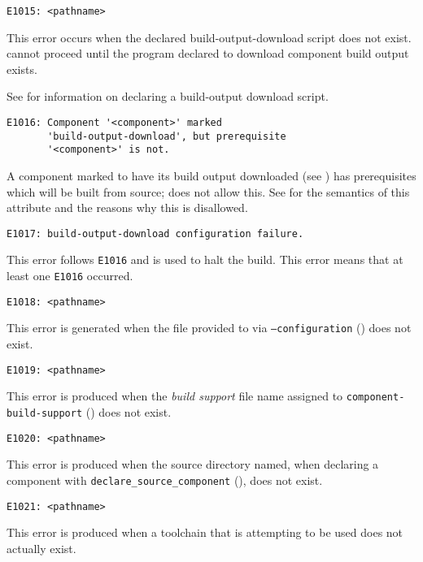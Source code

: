 \begin{verbatim}
E1015: <pathname>
\end{verbatim}

This error occurs when the declared build-output-download script does
not exist.  \lmsbw cannot proceed until the program declared to
download component build output exists.

See  for
information on declaring a build-output download script.


\begin{verbatim}
E1016: Component '<component>' marked
       'build-output-download', but prerequisite
       '<component>' is not.
\end{verbatim}

A component marked to have its build output downloaded (see
) has prerequisites which will be
built from source; \lmsbw does not allow this.  See
 for the semantics of this
attribute and the reasons why this is disallowed.


\begin{verbatim}
E1017: build-output-download configuration failure.
\end{verbatim}

This error follows \texttt{E1016} and is used to halt the build.  This
error means that at least one \texttt{E1016} occurred.


\begin{verbatim}
E1018: <pathname>
\end{verbatim}

This error is generated when the file provided to via
\texttt{--configuration} () does not
exist.


\begin{verbatim}
E1019: <pathname>
\end{verbatim}

This error is produced when the \emph{build support} file name
assigned to \texttt{component-build-support}
() does not exist.


\begin{verbatim}
E1020: <pathname>
\end{verbatim}

This error is produced when the source directory named, when declaring
a component with \texttt{declare\_source\_component}
(), does not exist.


\begin{verbatim}
E1021: <pathname>
\end{verbatim}

This error is produced when a toolchain that is attempting to be used
does not actually exist.
